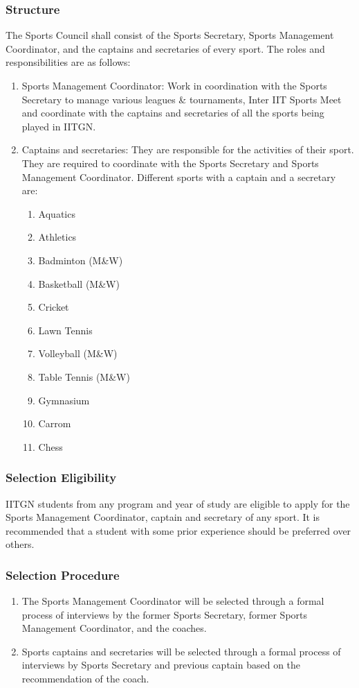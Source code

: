 \documentclass[12pt]{article}
\begin{document}
\subsubsection{Structure}
The Sports Council shall consist of the Sports Secretary, Sports
Management Coordinator, and the captains and secretaries of every
sport. The roles and responsibilities are as follows:
\begin{enumerate}
    \item Sports Management Coordinator: Work in coordination with the Sports Secretary to manage various leagues \& tournaments, Inter IIT Sports Meet and coordinate with the captains and secretaries of all the sports being played in IITGN.
    \item Captains and secretaries: They are responsible for the activities of their sport. They are required to coordinate with the Sports Secretary and Sports Management Coordinator. Different sports with a captain and a secretary are:
    \begin{enumerate}
        \item Aquatics
        \item Athletics
        \item Badminton (M\&W)
        \item Basketball (M\&W)
        \item Cricket
        \item Lawn Tennis
        \item Volleyball (M\&W)
        \item Table Tennis (M\&W)
        \item Gymnasium
        \item Carrom
        \item Chess
    \end{enumerate}
\end{enumerate}

\subsubsection{Selection Eligibility}
IITGN students from any program and year of study are eligible to apply for the Sports Management Coordinator, captain and secretary of any sport. It is recommended that a student with some prior experience should be preferred over others.

\subsubsection{Selection Procedure}
\begin{enumerate}
    \item The Sports Management Coordinator will be selected through a formal process of interviews by the former Sports Secretary, former Sports Management Coordinator, and the coaches.
    \item Sports captains and secretaries will be selected through a formal process of interviews by Sports Secretary and previous captain based on the recommendation of the coach.
\end{enumerate}
\end{document}
